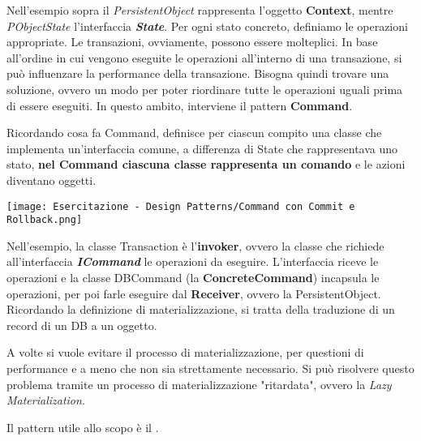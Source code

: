 {    Nell'esempio sopra il \textit{PersistentObject} rappresenta l'oggetto \textbf{Context}, mentre \textit{PObjectState}
    l'interfaccia \textbf{\textit{State}}. Per ogni stato concreto, definiamo le operazioni appropriate.
    \newpage
    Le transazioni, ovviamente, possono essere molteplici. In base all'ordine in cui vengono eseguite le operazioni all'interno
    di una transazione, si può influenzare la performance della transazione. Bisogna quindi trovare una soluzione, ovvero un modo
    per poter riordinare tutte le operazioni uguali prima di essere eseguiti. In questo ambito, interviene il pattern \textbf{Command}.
    
    Ricordando cosa fa Command, definisce per ciascun compito una classe che implementa un'interfaccia comune, a differenza di State che
    rappresentava uno stato, \textbf{nel Command ciascuna classe rappresenta un comando} e le azioni diventano oggetti.
    \begin{center}
        \texttt{[image: Esercitazione - Design Patterns/Command con Commit e Rollback.png]}
    \end{center}
    Nell'esempio, la classe Transaction è l'\textbf{invoker}, ovvero la classe che richiede all'interfaccia \textit{\textbf{ICommand}} le
    operazioni da eseguire. L'interfaccia riceve le operazioni e la classe DBCommand (la \textbf{ConcreteCommand}) incapsula le operazioni, per
    poi farle eseguire dal \textbf{Receiver}, ovvero la PersistentObject.
    \newpage
    Ricordando la definizione di materializzazione, si tratta della traduzione di un record di un DB a un oggetto.

    A volte si vuole evitare il processo di materializzazione, per questioni di performance e a meno che non sia strettamente necessario. Si può
    risolvere questo problema tramite un processo di materializzazione "ritardata", ovvero la \textit{Lazy Materialization}.

    Il pattern utile allo scopo è il .
    
    \newpage
    
    
    }
